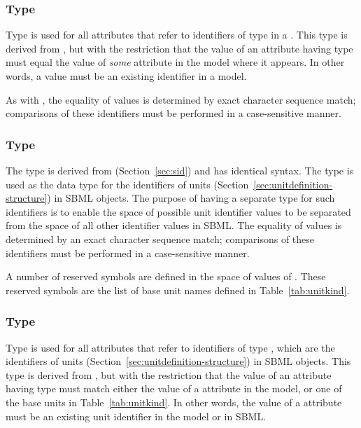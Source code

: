 \subsubsection{Type }
\label{sec:sidref}

Type  is used for all attributes that refer to
identifiers of type  in a \Model.  This type is
derived from , but with the restriction that the
value of an attribute having type  must equal the
value of \emph{some}  attribute in the model where
it appears.  In other words, a  value must be an
existing identifier in a model.

As with , the equality of  values
is determined by exact character sequence match; \ie comparisons
of these identifiers must be performed in a case-sensitive manner.


\subsubsection{Type }
\label{sec:unitsid}

The type  is derived from 
(Section~\ref{sec:sid}) and has identical syntax.  The
 type is used as the data type for the
identifiers of units (Section~\ref{sec:unitdefinition-structure})
in SBML objects.  The purpose of having a separate type for such
identifiers is to enable the space of possible unit identifier
values to be separated from the space of all other identifier
values in SBML.  The equality of  values is
determined by an exact character sequence match; \ie comparisons
of these identifiers must be performed in a case-sensitive manner.

A number of reserved symbols are defined in the space of values of
.  These reserved symbols are the list of base
unit names defined in Table~\vref{tab:unitkind}.


\subsubsection{Type }
\label{sec:unitsidref}

Type  is used for all attributes that refer
to identifiers of type , which are the
identifiers of units (Section~\ref{sec:unitdefinition-structure})
in SBML objects.  This type is derived from ,
but with the restriction that the value of an attribute having
type  must match either the value of a
 attribute in the model, or one of the
base units in Table~\ref{tab:unitkind}.  In other words,
the value of a  attribute must be an existing
unit identifier in the model or in SBML.

